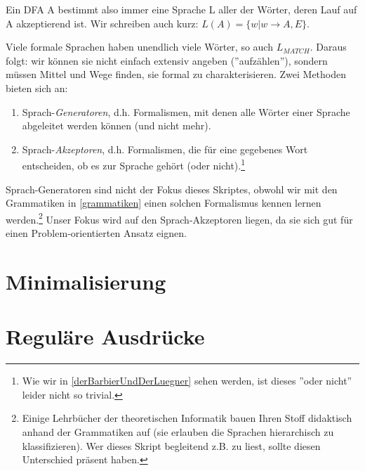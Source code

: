 Ein DFA A bestimmt also immer eine Sprache L aller der Wörter,
deren Lauf auf A akzeptierend ist.
Wir schreiben auch kurz: $L(A) = \{w|w \rightarrow A,E\}$.


Viele formale Sprachen haben unendlich viele Wörter,
so auch $L_{MATCH}$.
Daraus folgt: wir können sie nicht einfach extensiv angeben (''aufzählen''),
sondern müssen Mittel und Wege finden, sie formal zu charakterisieren.
Zwei Methoden bieten sich an:
\begin{enumerate}
    \item Sprach-\emph{Generatoren}, d.h. Formalismen,
        mit denen alle Wörter einer Sprache abgeleitet werden können
        (und nicht mehr).
    \item Sprach-\emph{Akzeptoren}, d.h. Formalismen,
        die für eine gegebenes Wort entscheiden,
        ob es zur Sprache gehört (oder nicht).\footnote{
            Wie wir in \autoref{derBarbierUndDerLuegner} sehen werden,
            ist dieses ''oder nicht'' leider nicht so trivial.}
\end{enumerate}

Sprach-Generatoren sind nicht der Fokus dieses Skriptes, obwohl wir mit den Grammatiken
in \autoref{grammatiken} einen solchen Formalismus kennen lernen werden.\footnote{
Einige Lehrbücher der theoretischen Informatik bauen Ihren Stoff didaktisch anhand der Grammatiken
auf (sie erlauben die Sprachen hierarchisch zu klassifizieren).
Wer dieses Skript begleitend z.B. zu \cite{schoening} liest,
sollte diesen Unterschied präsent haben.}
Unser Fokus wird auf den Sprach-Akzeptoren liegen,
da sie sich gut für einen Problem-orientierten Ansatz eignen.


\section{Minimalisierung}
\section{Reguläre Ausdrücke}
